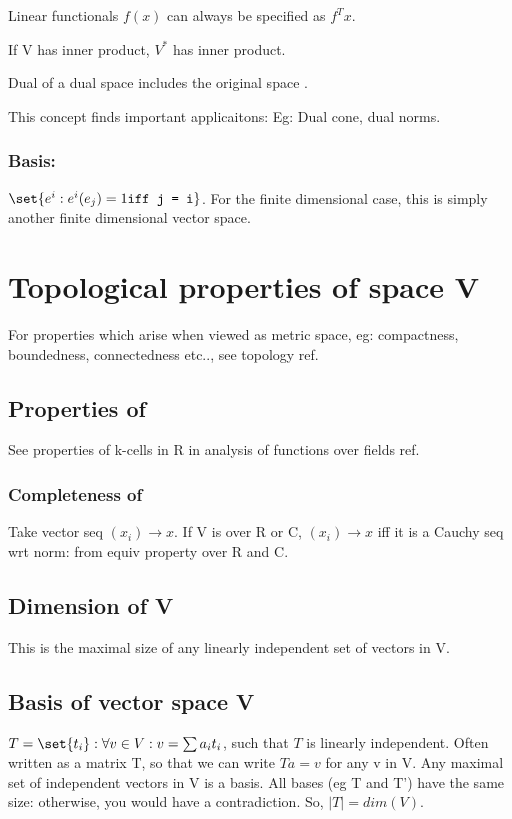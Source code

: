 \documentclass[oneside, article]{memoir}
\begin{document}
Linear functionals $f(x)$ can always be specified as $f^{T}x$.

If V has inner product, $V^{*}$ has inner product.

Dual of a dual space includes the original space \chk.

This concept finds important applicaitons: Eg: Dual cone, dual norms.

\subsection{Basis: }
$\set{e^{i}: e^{i}(e_j) = 1 \texttt{iff j = i}}$. For the finite dimensional case, this is simply another finite dimensional vector space.

\chapter{Topological properties of space V}
For properties which arise when viewed as metric space, eg: compactness, boundedness, connectedness etc.., see topology ref.

\section{Properties of }
See properties of k-cells in R in analysis of functions over fields ref.

\subsection{Completeness of }
Take vector seq $(x_{i}) \to x$. If V is over R or C, $(x_{i}) \to x$ iff it is a Cauchy seq wrt norm: from equiv property over R and C.

\section{Dimension of V}
This is the maximal size of any linearly independent set of vectors in V.

\section{Basis of vector space V}
$T = \set{t_i}: \forall v\in V: v = \sum a_i t_i$, such that $T$ is linearly independent. Often written as a matrix T, so that we can write $Ta = v$ for any v in V. Any maximal set of independent vectors in V is a basis. All bases (eg T and T') have the same size: otherwise, you would have a contradiction. So, $|T| = dim(V)$.
\end{document}
